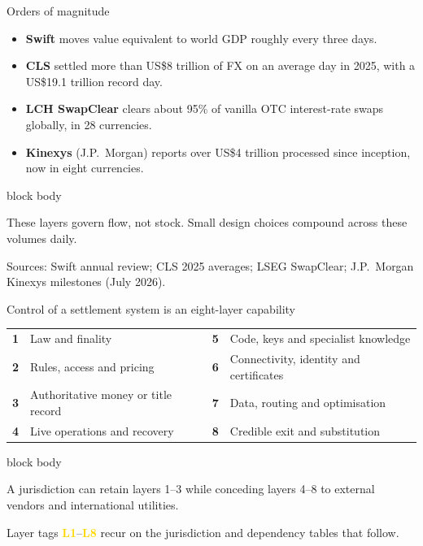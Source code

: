 \documentclass[aspectratio=169,12pt]{beamer}
\newcommand{\rust}[1]{\textcolor{Rust}{\textbf{#1}}}
\newcommand{\muted}[1]{\textcolor{Quiet}{#1}}
\newcommand{\source}[1]{\vfill\par\fontsize{5.4}{6.5}\selectfont\color{Quiet}Sources: #1}
\newcommand{\tightitems}{\setlength{\itemsep}{0.42em}\setlength{\parskip}{0pt}}
\newcommand{\lyr}[1]{\textcolor{Gold}{\fontsize{7.3}{8.4}\selectfont\bfseries L#1}}
\newenvironment{statement}{%
  \begin{beamercolorbox}[sep=.18cm,rounded=false,wd=\linewidth]{block body}%
  \fontsize{13}{15.5}\selectfont\bfseries
}{\end{beamercolorbox}}
\begin{document}
\begin{frame}{Orders of magnitude} %
  \begin{itemize}\tightitems
    \item \rust{Swift} moves value equivalent to world GDP roughly every three days.
    \item \rust{CLS} settled more than US\$8 trillion of FX on an average day in 2025, with a US\$19.1 trillion record day.
    \item \rust{LCH SwapClear} clears about 95\% of vanilla OTC interest-rate swaps globally, in 28 currencies.
    \item \rust{Kinexys} (J.P.\ Morgan) reports over US\$4 trillion processed since inception, now in eight currencies.
  \end{itemize}
  \vspace{0.22cm}
  \begin{statement}
    These layers govern flow, not stock. Small design choices compound across these volumes daily.
  \end{statement}
  \source{Swift annual review; CLS 2025 averages; LSEG SwapClear; J.P.\ Morgan Kinexys milestones (July 2026).}
\end{frame}

\begin{frame}[shrink=12]{Control of a settlement system is an eight-layer capability}
  \begin{tabularx}{\textwidth}{L{0.48cm}Y L{0.48cm}Y}
    \textcolor{Rust}{\textbf{1}} & Law and finality & \textcolor{Rust}{\textbf{5}} & Code, keys and specialist knowledge \\
    \addlinespace[0.35em]
    \textcolor{Rust}{\textbf{2}} & Rules, access and pricing & \textcolor{Rust}{\textbf{6}} & Connectivity, identity and certificates \\
    \addlinespace[0.35em]
    \textcolor{Rust}{\textbf{3}} & Authoritative money or title record & \textcolor{Rust}{\textbf{7}} & Data, routing and optimisation \\
    \addlinespace[0.35em]
    \textcolor{Rust}{\textbf{4}} & Live operations and recovery & \textcolor{Rust}{\textbf{8}} & Credible exit and substitution \\
  \end{tabularx}
  \vspace{0.30cm}
  \begin{statement}
    A jurisdiction can retain layers 1--3 while conceding layers 4--8 to external vendors and international utilities.
  \end{statement}
  \vspace{0.12cm}
  \muted{\fontsize{9.2}{11}\selectfont Layer tags \lyr{1}--\lyr{8} recur on the jurisdiction and dependency tables that follow.}
\end{frame}
\end{document}
